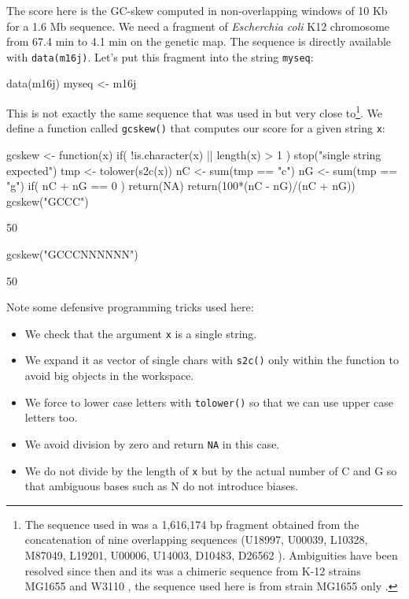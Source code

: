 \documentclass{article}
\begin{document}
The score here is the GC-skew computed in non-overlapping
windows of 10 Kb for a 1.6 Mb sequence.
We need a fragment of \textit{Escherchia coli} K12 chromosome from
67.4 min to 4.1 min on the genetic map. The sequence is directly available 
with \texttt{data(m16j)}. Let's put this fragment into the string \texttt{myseq}:

\begin{Schunk}
\begin{Sinput}
 data(m16j)
 myseq <- m16j
\end{Sinput}
\end{Schunk}

This is not exactly the same sequence that was used in \cite{LobryMBE96}
but very close to\footnote{
The sequence used in \cite{LobryMBE96} was a 1,616,174 bp fragment obtained
from the concatenation of nine overlapping sequences
(U18997, U00039, L10328, M87049, L19201, U00006, U14003, D10483, D26562
\cite{SofiaHJ1994, BurlandV1993, DanielsDL1992, PlunkettG1993, BlattnerFR1993, YuraT1992}).
Ambiguities have been resolved since then and its was a chimeric sequence
from K-12 strains MG1655 and W3110 \cite{HayashiK2006}, the sequence used here
is from strain MG1655 only \cite{BlattnerFR1997}. 
}. We define a function called \texttt{gcskew()} that computes our score 
for a given string \texttt{x}:

\begin{Schunk}
\begin{Sinput}
 gcskew <- function(x){
   if( !is.character(x) || length(x) > 1 ) stop("single string expected")
   tmp <- tolower(s2c(x))
   nC <- sum(tmp == "c")
   nG <- sum(tmp == "g")
   if( nC + nG == 0 ) return(NA)
   return(100*(nC - nG)/(nC + nG))
 }
 gcskew("GCCC")
\end{Sinput}
\begin{Soutput}
[1] 50
\end{Soutput}
\begin{Sinput}
 gcskew("GCCCNNNNNN")
\end{Sinput}
\begin{Soutput}
[1] 50
\end{Soutput}
\end{Schunk}

Note some defensive programming tricks used here:

\begin{itemize}
\item We check that the argument \texttt{x} is a single string.
\item We expand it as vector of single chars with \texttt{s2c()} only within the
      function to avoid big objects in the workspace.
\item We force to lower case letters with \texttt{tolower()} so that we can use 
      upper case letters too.
\item We avoid division by zero and return \texttt{NA} in this case.
\item We do not divide by the length of \texttt{x} but by the actual number
      of C and G so that ambiguous bases such as N do not introduce biases.
\end{itemize}
\end{document}
